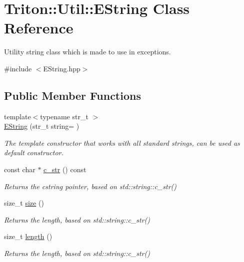 \hypertarget{class_triton_1_1_util_1_1_e_string}{}\section{Triton\+:\+:Util\+:\+:E\+String Class Reference}
\label{class_triton_1_1_util_1_1_e_string}


Utility string class which is made to use in exceptions.  




{\ttfamily \#include $<$E\+String.\+hpp$>$}

\subsection*{Public Member Functions}
\begin{DoxyCompactItemize}
\item 
{\footnotesize template$<$typename str\+\_\+t $>$ }\\\hyperlink{class_triton_1_1_util_1_1_e_string_acad169bceb9c61936647d1c98b73329b}{E\+String} (str\+\_\+t string= \textquotesingle{}\textquotesingle{})
\begin{DoxyCompactList}\small\item\em The template constructor that works with all standard strings, can be used as default constructor. \end{DoxyCompactList}\item 
const char $\ast$ \hyperlink{class_triton_1_1_util_1_1_e_string_aabfcad680e8bf14100ad54f242a8b9bc}{c\+\_\+str} () const 
\begin{DoxyCompactList}\small\item\em Returns the cstring pointer, based on std\+::string\+::c\+\_\+str() \end{DoxyCompactList}\item 
size\+\_\+t \hyperlink{class_triton_1_1_util_1_1_e_string_a7108f6bdd705012da00fead8fff6181d}{size} ()
\begin{DoxyCompactList}\small\item\em Returns the length, based on std\+::string\+::c\+\_\+str() \end{DoxyCompactList}\item 
size\+\_\+t \hyperlink{class_triton_1_1_util_1_1_e_string_a917f720139bec99a944f42fb1c64c42b}{length} ()
\begin{DoxyCompactList}\small\item\em Returns the length, based on std\+::string\+::c\+\_\+str() \end{DoxyCompactList}\item 

\end{DoxyCompactItemize}
